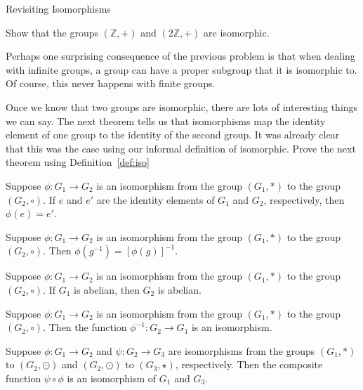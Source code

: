 \begin{section}{Revisiting Isomorphisms}
\begin{exercise}
\end{exercise}

\begin{problem}
Show that the groups $(\mathbb{Z},+)$ and $(2\mathbb{Z},+)$ are isomorphic.
\end{problem}

Perhaps one surprising consequence of the previous problem is that when dealing with infinite groups, a group can have a proper subgroup that it is isomorphic to.  Of course, this never happens with finite groups.

Once we know that two groups are isomorphic, there are lots of interesting things we can say.  The next theorem tells us that isomorphisms map the identity element of one group to the identity of the second group.  It was already clear that this was the case using our informal definition of isomorphic.  Prove the next theorem using Definition~\ref{def:iso}

\begin{theorem}\label{thm:hom_id}
Suppose $\phi:G_1\to G_2$ is an isomorphism from the group $(G_1,*)$ to the group $(G_2,\circ)$.  If $e$ and $e'$ are the identity elements of $G_1$ and $G_2$, respectively, then $\phi(e)=e'$.
\end{theorem}

\begin{theorem}\label{thm:hom_inverse}
Suppose $\phi:G_1\to G_2$ is an isomorphism from the group $(G_1,*)$ to the group $(G_2,\circ)$.   Then $\phi(g^{-1})=[\phi(g)]^{-1}$.
\end{theorem}

\begin{theorem}
Suppose $\phi:G_1\to G_2$ is an isomorphism from the group $(G_1,*)$ to the group $(G_2,\circ)$. If $G_1$ is abelian, then $G_2$ is abelian.
\end{theorem}

\begin{theorem}
Suppose $\phi:G_1\to G_2$ is an isomorphism from the group $(G_1,*)$ to the group $(G_2,\circ)$. Then the function $\phi^{-1}:G_2\to G_1$ is an isomorphism.
\end{theorem}

\begin{theorem}
Suppose $\phi:G_1\to G_2$ and $\psi:G_2\to G_3$ are isomorphisms from the groups $(G_1,*)$ to $(G_2,\odot)$ and $(G_2,\odot)$ to $(G_3,\star)$, respectively. Then the composite function $\psi\circ\phi$ is an isomorphism of $G_1$ and $G_3$.
\end{theorem}


\end{section}
